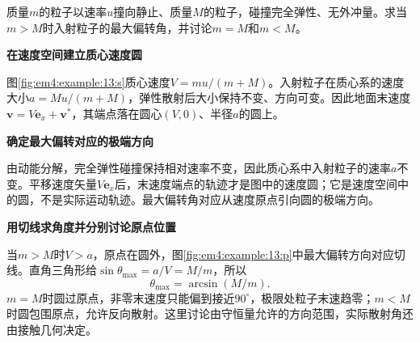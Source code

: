 \begin{question}\begin{example}[弹性散射的最大偏转角]\label{em4:example:13}
质量$m$的粒子以速率$u$撞向静止、质量$M$的粒子，碰撞完全弹性、无外冲量。求当$m>M$时入射粒子的最大偏转角，并讨论$m=M$和$m<M$。
\end{example}
\end{question}
\begin{solution}\textbf{在速度空间建立质心速度圆}\par\nobreak
图\ref{fig:em4:example:13:s}质心速度$V=mu/(m+M)$。入射粒子在质心系的速度大小$a=Mu/(m+M)$，弹性散射后大小保持不变、方向可变。因此地面末速度$\bm v=V\bm e_x+\bm v^*$，其端点落在圆心$(V,0)$、半径$a$的圆上。



\par\medskip{}\noindent\textbf{确定最大偏转对应的极端方向}\par\nobreak
由动能分解，完全弹性碰撞保持相对速率不变，因此质心系中入射粒子的速率$a$不变。平移速度矢量$V\bm e_x$后，末速度端点的轨迹才是图中的速度圆；它是速度空间中的圆，不是实际运动轨迹。最大偏转角对应从速度原点引向圆的极端方向。



\par\medskip{}\noindent\textbf{用切线求角度并分别讨论原点位置}\par\nobreak
当$m>M$时$V>a$，原点在圆外，图\ref{fig:em4:example:13:p}中最大偏转方向对应切线。直角三角形给$\sin\theta_{\max}=a/V=M/m$，所以
\[\boxed{\theta_{\max}=\arcsin(M/m)}.\]
$m=M$时圆过原点，非零末速度只能偏到接近$90^\circ$，极限处粒子末速趋零；$m<M$时圆包围原点，允许反向散射。这里讨论由守恒量允许的方向范围，实际散射角还由接触几何决定。\end{solution}
